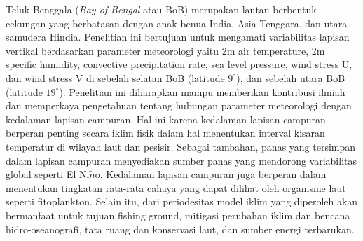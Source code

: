 \begin{spacing}{1.5}
	\pagestyle{empty}
	\begin{center}
		\vskip 1cm
		\justifying
		Teluk Benggala (\textit{Bay of Bengal} atau BoB) merupakan lautan berbentuk cekungan yang berbatasan dengan anak benua India, Asia Tenggara, dan utara samudera Hindia. Penelitian ini bertujuan untuk mengamati variabilitas lapisan vertikal berdasarkan parameter meteorologi yaitu 2m air temperature, 2m specific humidity, convective precipitation rate, sea level pressure, wind stress U, dan wind stress V di sebelah selatan BoB (latitude $9^\circ$), dan sebelah utara BoB (latitude $19^\circ$). Penelitian ini diharapkan mampu memberikan kontribusi ilmiah dan memperkaya pengetahuan tentang hubungan parameter meteorologi dengan kedalaman lapisan campuran. Hal ini karena kedalaman lapisan campuran berperan penting secara iklim fisik dalam hal menentukan interval kisaran temperatur di wilayah laut dan pesisir. Sebagai tambahan, panas yang tersimpan dalam lapisan campuran menyediakan sumber panas yang mendorong variabilitas global seperti El Ni$\tilde{n}$o. Kedalaman lapisan campuran juga berperan dalam menentukan tingkatan rata-rata cahaya yang dapat dilihat oleh organisme laut seperti fitoplankton. Selain itu, dari periodesitas model iklim yang diperoleh akan bermanfaat untuk tujuan fishing ground, mitigasi perubahan iklim dan bencana hidro-oseanografi, tata ruang dan konservasi laut, dan sumber energi terbarukan.
	\end{center}
\end{spacing}
\pagestyle{empty}